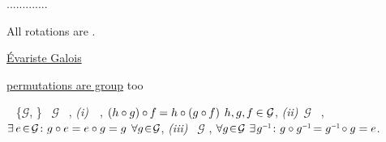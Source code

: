 .............

All rotations are 
\href{https://en.wikipedia.org/wiki/Group_theory}{}
\href{https://en.wikipedia.org/wiki/Abstract_algebra}{}.

\href{https://en.wikipedia.org/wiki/%C3%89variste_Galois}{Évariste Galois}

\href{https://en.wikipedia.org/wiki/Permutation_group}{permutations are group} too

\emph{}~%
\{\hspace{.3ex}$\mathcal{G}$,\hspace{-0.4ex} \inquotes{$\circ\hspace{.1ex}$}\hspace{.3ex}\}
~$\mathcal{G}$
~\inquotes{$\circ\hspace{.1ex}$},
\textit{(i)}~\inquotes{$\circ\hspace{.1ex}$}~,
${( h \circ g ) \circ \hspace{-0.1ex} f \hspace{-0.1ex} = h \circ ( g \circ \hspace{-0.1ex} f )}$
${h, g, \hspace{-0.1ex} f \hspace{-0.1ex} \in \mathcal{G}}$,
\textit{(ii)}~$\mathcal{G}$~  ,
${\exists \hspace{.4ex} e {\hspace{.3ex} \in \hspace{.3ex}} \mathcal{G} \colon g \circ e = e \circ g = g \hspace{1ex} \forall g {\hspace{.2ex} \in \hspace{.2ex}} \mathcal{G}}$,
\textit{(iii)}~ $\mathcal{G}$   ,
${\forall g {\hspace{.2ex} \in \hspace{.2ex}} \mathcal{G} \hspace{.8ex} \exists \hspace{.2ex} g^{\littleminusone} \colon g \circ g^{\littleminusone} \hspace{-0.25ex} = g^{\littleminusone} \hspace{-0.25ex} \circ g = e}$.

